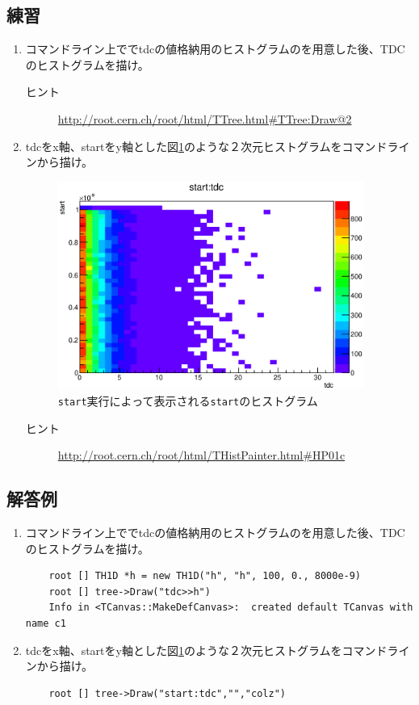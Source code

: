 \documentclass{jarticle}
\begin{document}
  \subsection{練習}
  \begin{enumerate}
   \item コマンドライン上ででtdcの値格納用のヒストグラムのを用意した後、TDCのヒストグラムを描け。
	 \begin{description}
	  \item[ヒント] \url{http://root.cern.ch/root/html/TTree.html#TTree:Draw@2}
	 \end{description}
   \item tdcをx軸、startをy軸とした図\ref{Fig:meettreecanvas3}のような２次元ヒストグラムをコマンドラインから描け。
	 \begin{figure}[htbp]
	  \begin{center}
	   \includegraphics[width = 100mm]{./picture/meettreecanvas3.eps}
	  \end{center}
	  \caption{\texttt{start}実行によって表示される\texttt{start}のヒストグラム}
	  \label{Fig:meettreecanvas3}
	 \end{figure}


	 \begin{description}
	  \item[ヒント] \url{http://root.cern.ch/root/html/THistPainter.html#HP01c}
	 \end{description}
  \end{enumerate}

  \subsection{解答例}
  \begin{enumerate}
   \item コマンドライン上ででtdcの値格納用のヒストグラムのを用意した後、TDCのヒストグラムを描け。
\begin{verbatim}
	root [] TH1D *h = new TH1D("h", "h", 100, 0., 8000e-9)
	root [] tree->Draw("tdc>>h")
	Info in <TCanvas::MakeDefCanvas>:  created default TCanvas with name c1
\end{verbatim}
   \item tdcをx軸、startをy軸とした図\ref{Fig:meettreecanvas3}のような２次元ヒストグラムをコマンドラインから描け。
\begin{verbatim}
	root [] tree->Draw("start:tdc","","colz")
\end{verbatim}
  \end{enumerate}
\end{document}
